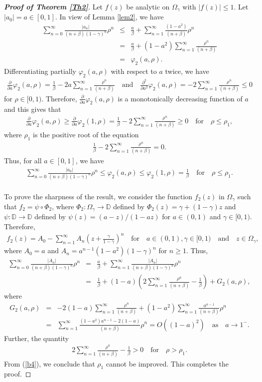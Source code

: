 \documentclass[11pt,reqno]{amsart}
\newtheorem{open problem}{Open problem}[section]
\newcommand{\pa}{\partial}
\newcommand{\beas}{\begin{eqnarray*}}
\newcommand{\eeas}{\end{eqnarray*}}
\newcommand{\bea}{\begin{eqnarray}}
\newcommand{\eea}{\end{eqnarray}}
\numberwithin{equation}{section}
\begin{document}
\begin{proof}[{\bf Proof of Theorem \ref{Th2}}]
Let $f(z)$ be analytic on $\Omega_{\gamma}$ with $|f(z)|\leq 1$. Let $|a_0|=a\in[0,1]$. In view of \textrm{Lemma \ref{lem2}}, we have
\beas \sum_{n=0}^\infty \frac{|a_n|}{(n+\beta)(1-\gamma)^n}\rho^n&\leq& \frac{a}{\beta}+\sum_{n=1}^\infty \frac{(1-a^2)}{(n+\beta)}\rho^n\\[2mm]
&=& \frac{a}{\beta}+(1-a^2)\sum_{n=1}^\infty \frac{\rho^n}{(n+\beta)}\\[2mm]&=&\varphi_2(a,\rho).\eeas
Differentiating partially $\varphi_2(a,\rho)$ with respect to $a$ twice, we have   
\beas\frac{\pa }{\pa a}\varphi_2(a,\rho)=\frac{1}{\beta} - 2 a\sum_{n=1}^\infty \frac{\rho^n}{(n+\beta)}\quad\text{and}\quad\frac{\pa^2 }{\pa a^2}\varphi_2(a,\rho)=-2 \sum_{n=1}^\infty \frac{\rho^n}{(n+\beta)}\leq 0\eeas
for $\rho\in[0,1)$.
Therefore, $\frac{\pa}{\pa a} \varphi_2(a,\rho)$ is a monotonically decreasing function of $a$ and this gives that 
\beas \frac{\pa}{\pa a}\varphi_2(a,\rho)\geq \frac{\pa}{\pa a}\varphi_2(1,\rho)=\frac{1}{\beta} - 2\sum_{n=1}^\infty \frac{\rho^n}{(n+\beta)}\geq 0\quad\text{for}\quad\rho\leq \rho_1,\eeas
where $\rho_1$ is the positive root of the equation 
\beas \frac{1}{\beta} - 2\sum_{n=1}^\infty \frac{\rho^n}{(n+\beta)}=0.\eeas
Thus, for all $a\in[0,1]$, we have 
\beas \sum_{n=0}^\infty \frac{|a_n|}{(n+\beta)(1-\gamma)^n}\rho^n\leq \varphi_2(a,\rho)\leq \varphi_2(1,\rho)=\frac{1}{\beta}\quad\text{for}\quad\rho\leq \rho_1.\eeas\\[2mm]
\indent To prove the sharpness of the result, we consider the function $f_2(z)$ in $\Omega_{\gamma}$ such that $f_2=\psi\circ\Phi_2$, where $\Phi_2 : \Omega_{\gamma}\to\mathbb{D}$ defined by $\Phi_2(z)=\gamma+(1-\gamma)z$ and $\psi : \mathbb{D}\to\mathbb{D}$ defined by $\psi(z)=(a-z)/(1-az)$ for $a\in(0,1)$ and $\gamma\in[0,1)$.
Therefore,
\beas f_2(z)=A_0-\sum_{n=1}^\infty A_n \left(z+\frac{\gamma}{1-\gamma}\right)^n\quad\text{for}\quad a\in(0,1), \gamma\in[0,1)\quad\text{and}\quad z\in\Omega_{\gamma},\eeas	
where $A_0=a$ and $A_n=a^{n-1}(1-a^2)(1-\gamma)^n$ for $n\geq 1$. Thus,
\bea\label{b4}\sum_{n=0}^\infty \frac{|A_n|}{(n+\beta)(1-\gamma)^n}\rho^n&=&\frac{a}{\beta}+\sum_{n=1}^\infty \frac{|A_n|}{(n+\beta)(1-\gamma)^n}\rho^n\nonumber\\[2mm]
&=&\frac{1}{\beta}+(1-a)\left(2\sum_{n=1}^\infty \frac{\rho^n}{(n+\beta)}-\frac{1}{\beta} \right)+G_2(a,\rho),\eea
where
\beas G_2(a,\rho)&=&-2(1-a)\sum_{n=1}^\infty \frac{\rho^n}{(n+\beta)}+(1-a^2)\sum_{n=1}^\infty \frac{a^{n-1}}{(n+\beta)}\rho^n\\[2mm]
&=&\sum_{n=1}^\infty\frac{(1-a^2)a^{n-1}-2(1-a)}{(n+\beta)}\rho^n=O((1-a)^2)\quad\text{as}\quad a\to 1^-.\eeas 
Further, the quantity 
\beas 2\sum_{n=1}^\infty \frac{\rho^n}{(n+\beta)}-\frac{1}{\beta}>0\quad\text{for}\quad\rho>\rho_1.\eeas
From (\ref{b4}), we conclude that $\rho_1$ cannot be improved. This completes the proof.
\end{proof}
\end{document}
